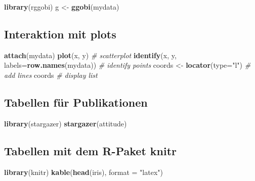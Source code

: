 \documentclass[]{article}
\newenvironment{Shaded}{\begin{snugshade}}{\end{snugshade}}
\newcommand{\KeywordTok}[1]{\textcolor[rgb]{0.13,0.29,0.53}{\textbf{{#1}}}}
\newcommand{\DataTypeTok}[1]{\textcolor[rgb]{0.13,0.29,0.53}{{#1}}}
\newcommand{\StringTok}[1]{\textcolor[rgb]{0.31,0.60,0.02}{{#1}}}
\newcommand{\CommentTok}[1]{\textcolor[rgb]{0.56,0.35,0.01}{\textit{{#1}}}}
\newcommand{\NormalTok}[1]{{#1}}
\begin{document}
\begin{Shaded}
\begin{Highlighting}[]
\KeywordTok{library}\NormalTok{(rggobi)}
\NormalTok{g <-}\StringTok{ }\KeywordTok{ggobi}\NormalTok{(mydata) }
\end{Highlighting}
\end{Shaded}

\subsection{Interaktion mit plots}\label{interaktion-mit-plots}

\begin{Shaded}
\begin{Highlighting}[]
\KeywordTok{attach}\NormalTok{(mydata)}
\KeywordTok{plot}\NormalTok{(x, y) }\CommentTok{# scatterplot}
\KeywordTok{identify}\NormalTok{(x, y, }\DataTypeTok{labels=}\KeywordTok{row.names}\NormalTok{(mydata)) }\CommentTok{# identify points}
\NormalTok{coords <-}\StringTok{ }\KeywordTok{locator}\NormalTok{(}\DataTypeTok{type=}\StringTok{"l"}\NormalTok{) }\CommentTok{# add lines}
\NormalTok{coords }\CommentTok{# display list }
\end{Highlighting}
\end{Shaded}

\subsection{Tabellen für
Publikationen}\label{tabellen-fur-publikationen}

\begin{Shaded}
\begin{Highlighting}[]
\KeywordTok{library}\NormalTok{(stargazer)}
\KeywordTok{stargazer}\NormalTok{(attitude)}
\end{Highlighting}
\end{Shaded}

\subsection{Tabellen mit dem R-Paket
knitr}\label{tabellen-mit-dem-r-paket-knitr}

\begin{Shaded}
\begin{Highlighting}[]
\KeywordTok{library}\NormalTok{(knitr)}
\KeywordTok{kable}\NormalTok{(}\KeywordTok{head}\NormalTok{(iris), }\DataTypeTok{format =} \StringTok{"latex"}\NormalTok{)}
\end{Highlighting}
\end{Shaded}
\end{document}

